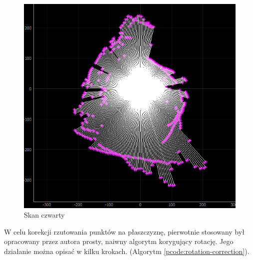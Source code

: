 \begin{figure}[ht]
	\centering
		\includegraphics[width=0.5\linewidth]{rys/ScanBot-12-calibrated-room-map4.PNG}
	\caption{Skan czwarty}
	\label{fig:overlapping-4}
\end{figure}

W celu korekcji rzutowania punktów na płaszczyznę, pierwotnie stosowany był opracowany przez autora prosty, naiwny algorytm korygujący rotację. Jego działanie można opisać w kilku krokach. (Algorytm \ref{pcode:rotation-correction}).

